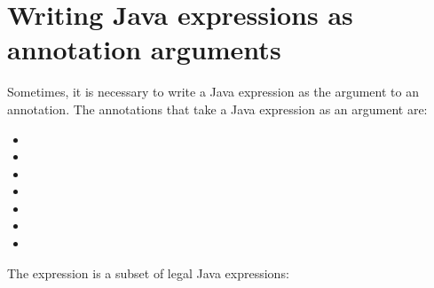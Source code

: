 \section{Writing Java expressions as annotation arguments\label{java-expressions-as-arguments}}

Sometimes, it is necessary to write a Java expression as the argument to an
annotation.  The annotations that take a Java
expression as an argument are:

\begin{itemize}
\item {}
\item {}
\item {}
\item {}
\item {}
\item {}
\item {}
\end{itemize}

The expression is a subset of legal Java expressions:

